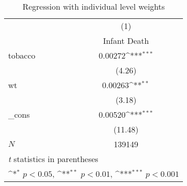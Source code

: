 \begin{table}[htbp]\centering
\def\sym#1{\ifmmode^{#1}\else\(^{#1}\)\fi}
\caption{Regression with individual level weights\label{i2}}
\begin{tabular}{l*{1}{c}}
\hline\hline
            &\multicolumn{1}{c}{(1)}\\
            &\multicolumn{1}{c}{Infant Death}\\
\hline
tobacco     &     0.00272\sym{***}\\
            &      (4.26)         \\
[1em]
wt          &     0.00263\sym{**} \\
            &      (3.18)         \\
[1em]
\_cons      &     0.00520\sym{***}\\
            &     (11.48)         \\
\hline
\(N\)       &      139149         \\
\hline\hline
\multicolumn{2}{l}{\footnotesize \textit{t} statistics in parentheses}\\
\multicolumn{2}{l}{\footnotesize \sym{*} \(p<0.05\), \sym{**} \(p<0.01\), \sym{***} \(p<0.001\)}\\
\end{tabular}
\end{table}
